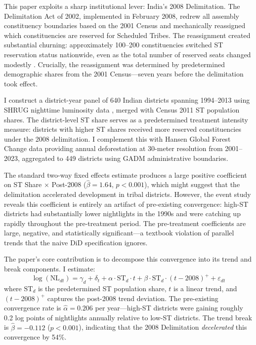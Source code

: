 \documentclass[12pt]{article}
\begin{document}
This paper exploits a sharp institutional lever: India's 2008 Delimitation. The Delimitation Act of 2002, implemented in February 2008, redrew all assembly constituency boundaries based on the 2001 Census and mechanically reassigned which constituencies are reserved for Scheduled Tribes. The reassignment created substantial churning: approximately 100--200 constituencies switched ST reservation status nationwide, even as the total number of reserved seats changed modestly \citep{iyer2010}. Crucially, the reassignment was determined by predetermined demographic shares from the 2001 Census---seven years before the delimitation took effect.

I construct a district-year panel of 640 Indian districts spanning 1994--2013 using SHRUG nighttime luminosity data \citep{asher2021shrug}, merged with Census 2011 ST population shares. The district-level ST share serves as a predetermined treatment intensity measure: districts with higher ST shares received more reserved constituencies under the 2008 delimitation. I complement this with Hansen Global Forest Change data \citep{hansen2013gfc} providing annual deforestation at 30-meter resolution from 2001--2023, aggregated to 449 districts using GADM administrative boundaries.

The standard two-way fixed effects estimate produces a large positive coefficient on ST Share $\times$ Post-2008 ($\hat{\beta} = 1.64$, $p < 0.001$), which might suggest that the delimitation accelerated development in tribal districts. However, the event study reveals this coefficient is entirely an artifact of pre-existing convergence: high-ST districts had substantially lower nightlights in the 1990s and were catching up rapidly throughout the pre-treatment period. The pre-treatment coefficients are large, negative, and statistically significant---a textbook violation of parallel trends that the naive DiD specification ignores.

The paper's core contribution is to decompose this convergence into its trend and break components. I estimate:
\begin{equation}
\log(\text{NL}_{dt}) = \gamma_d + \delta_t + \alpha \cdot \text{ST}_d \cdot t + \beta \cdot \text{ST}_d \cdot (t - 2008)^+ + \varepsilon_{dt}
\label{eq:trendbreak}
\end{equation}
where $\text{ST}_d$ is the predetermined ST population share, $t$ is a linear trend, and $(t-2008)^+$ captures the post-2008 trend deviation. The pre-existing convergence rate is $\hat{\alpha} = 0.206$ per year---high-ST districts were gaining roughly 0.2 log points of nightlights annually relative to low-ST districts. The trend break is $\hat{\beta} = -0.112$ ($p < 0.001$), indicating that the 2008 Delimitation \textit{decelerated} this convergence by 54\%.
\end{document}
